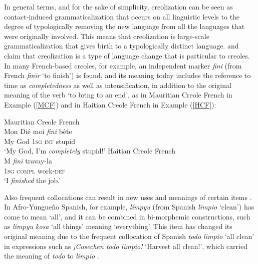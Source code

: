 \documentclass[output=paper]{langscibook}
\begin{document}
In general terms, and for the sake of simplicity, creolization can be seen as contact-induced grammaticalization that occurs on all linguistic levels to the degree of typologically removing the new language from all the languages that were originally involved. This means that creolization is large-scale grammaticalization that gives birth to a typologically distinct language. \citet{detges2000two} and \citet{bruyn2008grammaticalization} claim that creolization is a type of language change that is particular to creoles. In many French-based creoles, for example, an independent marker \textit{fini} (from French \textit{finir} ‘to finish’) is found, and its meaning today includes the reference to time as \textit{completedness} as well as intensification, in addition to the original meaning of the verb ‘to bring to an end’, as in Mauritian Creole French in Example (\ref{MCF}) and in Haitian Creole French in Example (\ref{HCF}):


\ea Mauritian Creole French \citep[139]{detges2000two}\\\label{MCF}
\gll Mon Dié moi \textit{fini} bête\\ 
My God \textsc{1sg} \textsc{int} stupid\\
\glt ‘My God, I’m \textit{completely} stupid!’ 
\ex Haitian Creole French \citep[140]{detges2000two}\\\label{HCF}
\gll M \textit{fini} travay-la\\ 
\textsc{1sg} \textsc{compl} work-\textsc{def}\\
\glt ‘I \textit{finished} the job.’
\z


Also frequent collocations can result in new uses and meanings of certain items \citep{detges2000two}. In Afro-Yungueño Spanish, for example, \emph{límpyu} (from Spanish \emph{limpio} ‘clean’) has come to mean ‘all’, and it can be combined in bi-morphemic constructions, such as \emph{limpyu kosa} ‘all things’ meaning ‘everything’. This item has changed its original meaning due to the frequent collocation of Spanish \emph{todo limpio} ‘all clean’ in expressions such as \emph{¡Cosechen todo limpio!} ‘Harvest all clean!’, which carried the meaning of \emph{todo} to \emph{limpio} \citep[322]{perez2015traces}.
\end{document}
